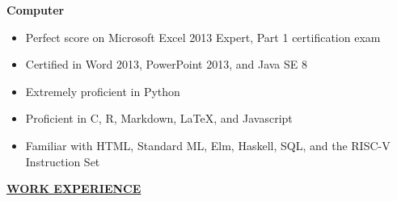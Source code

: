 \documentclass[
]{article}
\providecommand{\tightlist}{%
  \setlength{\itemsep}{0pt}\setlength{\parskip}{0pt}}
\begin{document}
\textbf{Computer}

\begin{itemize}
\item
  Perfect score on Microsoft Excel 2013 Expert, Part 1 certification
  exam
\item
  Certified in Word 2013, PowerPoint 2013, and Java SE 8
\end{itemize}

\begin{itemize}
\item
  Extremely proficient in Python
\item
  Proficient in C, R, Markdown, LaTeX, and Javascript
\item
  Familiar with HTML, Standard ML, Elm, Haskell, SQL, and the RISC-V
  Instruction Set
\end{itemize}





\textbf{\underline{WORK EXPERIENCE}}



\end{document}

